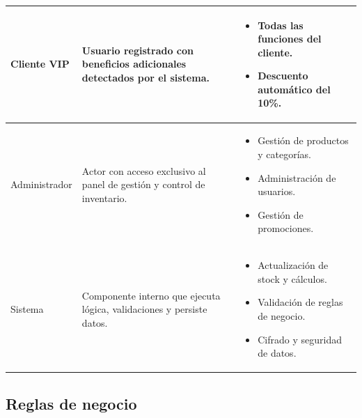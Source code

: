 \documentclass[12pt,a4paper]{article}
\begin{document}
\begin{longtable}{|l|p{7.5cm}|p{5.5cm}|}
    Cliente VIP                                                                             &
    Usuario registrado con beneficios adicionales detectados por el sistema.                &
    \begin{itemize}[leftmargin=*, nosep]
        \item Todas las funciones del cliente.
        \item Descuento automático del 10\%.
    \end{itemize}                                                                                                      \\ \hline

    Administrador                                                                           &
    Actor con acceso exclusivo al panel de gestión y control de inventario.                 &
    \begin{itemize}[leftmargin=*, nosep]
        \item Gestión de productos y categorías.
        \item Administración de usuarios.
        \item Gestión de promociones.
    \end{itemize}                                                                                                    \\ \hline

    Sistema                                                                                 &
    Componente interno que ejecuta lógica, validaciones y persiste datos.                   &
    \begin{itemize}[leftmargin=*, nosep]
        \item Actualización de stock y cálculos.
        \item Validación de reglas de negocio.
        \item Cifrado y seguridad de datos.
    \end{itemize}
    \\ \hline
\end{longtable}


\subsection{Reglas de negocio}
\end{document}
